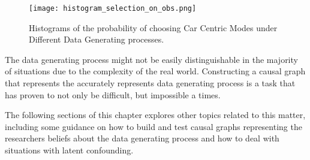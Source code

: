 \begin{figure}
   \centering
   \texttt{[image: histogram\_selection\_on\_obs.png]}
   \caption{Histograms of the probability of choosing Car Centric Modes under Different Data Generating processes.}
   \label{fig:histogram_probability}
\end{figure}

The data generating process might not be easily distinguishable in the majority of situations due to the complexity of the real world.
Constructing a causal graph that represents the accurately represents data generating process is a task that has proven to not only be difficult, but impossible a times.

The following sections of this chapter explores other topics related to this matter, including some guidance on how to build and test causal graphs representing the researchers beliefs about the data generating process and how to deal with situations with latent confounding.